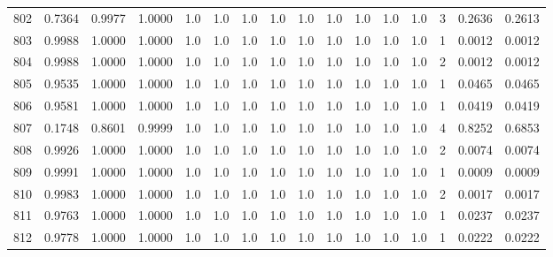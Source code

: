 \begin{tabular}{lrrrrrrrrrrrrrrr}
802 &      0.7364 &  0.9977 &  1.0000 &     1.0 &     1.0 &     1.0 &     1.0 &     1.0 &     1.0 &     1.0 &      1.0 &        1.0 &      3 &                    0.2636 &                     0.2613 \\
803 &      0.9988 &  1.0000 &  1.0000 &     1.0 &     1.0 &     1.0 &     1.0 &     1.0 &     1.0 &     1.0 &      1.0 &        1.0 &      1 &                    0.0012 &                     0.0012 \\
804 &      0.9988 &  1.0000 &  1.0000 &     1.0 &     1.0 &     1.0 &     1.0 &     1.0 &     1.0 &     1.0 &      1.0 &        1.0 &      2 &                    0.0012 &                     0.0012 \\
805 &      0.9535 &  1.0000 &  1.0000 &     1.0 &     1.0 &     1.0 &     1.0 &     1.0 &     1.0 &     1.0 &      1.0 &        1.0 &      1 &                    0.0465 &                     0.0465 \\
806 &      0.9581 &  1.0000 &  1.0000 &     1.0 &     1.0 &     1.0 &     1.0 &     1.0 &     1.0 &     1.0 &      1.0 &        1.0 &      1 &                    0.0419 &                     0.0419 \\
807 &      0.1748 &  0.8601 &  0.9999 &     1.0 &     1.0 &     1.0 &     1.0 &     1.0 &     1.0 &     1.0 &      1.0 &        1.0 &      4 &                    0.8252 &                     0.6853 \\
808 &      0.9926 &  1.0000 &  1.0000 &     1.0 &     1.0 &     1.0 &     1.0 &     1.0 &     1.0 &     1.0 &      1.0 &        1.0 &      2 &                    0.0074 &                     0.0074 \\
809 &      0.9991 &  1.0000 &  1.0000 &     1.0 &     1.0 &     1.0 &     1.0 &     1.0 &     1.0 &     1.0 &      1.0 &        1.0 &      1 &                    0.0009 &                     0.0009 \\
810 &      0.9983 &  1.0000 &  1.0000 &     1.0 &     1.0 &     1.0 &     1.0 &     1.0 &     1.0 &     1.0 &      1.0 &        1.0 &      2 &                    0.0017 &                     0.0017 \\
811 &      0.9763 &  1.0000 &  1.0000 &     1.0 &     1.0 &     1.0 &     1.0 &     1.0 &     1.0 &     1.0 &      1.0 &        1.0 &      1 &                    0.0237 &                     0.0237 \\
812 &      0.9778 &  1.0000 &  1.0000 &     1.0 &     1.0 &     1.0 &     1.0 &     1.0 &     1.0 &     1.0 &      1.0 &        1.0 &      1 &                    0.0222 &                     0.0222 \\

\end{tabular}
